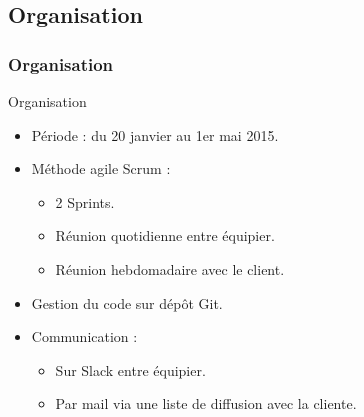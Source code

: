 \subsection{Organisation}
\begin{frame}
    \frametitle{\color{white}Organisation}
  \begin{block}{Organisation}
    \begin{itemize}
     \item Période : du 20 janvier au 1er mai 2015.
     \item Méthode agile Scrum :
     \begin{itemize}
       \item 2 Sprints.
       \item Réunion quotidienne entre équipier.
       \item Réunion hebdomadaire avec le client.
      \end{itemize}
     \item Gestion du code sur dépôt Git.
     \item Communication :
      \begin{itemize}
       \item Sur Slack entre équipier.
       \item Par mail via une liste de diffusion avec la cliente.
      \end{itemize}

    \end{itemize}
  \end{block}
\end{frame}
